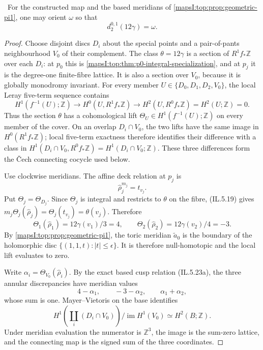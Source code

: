 \begin{lemma}
\label{mapsI:top:lem:first-transgression}
\ For the constructed map and the based meridians of
\cref{mapsI:top:prop:geometric-pi1}, one may orient \(\omega\) so that
\[
 d_2^{0,1}(12\gamma)=\omega.
\tag{IL.5.18}
\]
\end{lemma}

\begin{proof}
Choose disjoint discs \(D_i\) about the special points and a pair-of-pants
neighbourhood \(V_0\) of their complement.  The class
\(\theta=12\gamma\) is a section of \(R^1f_*\mathbb Z\) over each \(D_i\):
at \(p_0\) this is \cref{mapsI:top:thm:p0-integral-specialization}, and at \(p_j\)
it is the degree-one finite-fibre lattice.  It is also a section over
\(V_0\), because it is globally monodromy invariant.  For every member
\(U\in\{D_0,D_1,D_2,V_0\}\), the local Leray five-term sequence contains
\[
 H^1(f^{-1}(U);\mathbb Z)\longrightarrow
 H^0(U,R^1f_*\mathbb Z)\longrightarrow
 H^2(U,R^0f_*\mathbb Z)=H^2(U;\mathbb Z)=0.
\]
Thus the section \(\theta\) has a cohomological lift
\(\Theta_U\in H^1(f^{-1}(U);\mathbb Z)\) on every member of the cover.
On an overlap \(D_i\cap V_0\), the two lifts have the same image in
\(H^0(R^1f_*\mathbb Z)\); local five-term exactness therefore identifies
their difference with a class in
\(H^1(D_i\cap V_0,R^0f_*\mathbb Z)=H^1(D_i\cap V_0;\mathbb Z)\).
These three differences form the \v{C}ech connecting cocycle used below.

Use clockwise meridians.  The affine deck relation at \(p_j\) is
\[
 \widehat\rho_j^{m_j}=t_{v_j}.
\tag{IL.5.19}
\]
Put \(\Theta_j=\Theta_{D_j}\).  Since \(\Theta_j\) is integral and restricts
to \(\theta\) on the fibre, (IL.5.19) gives
\(m_j\Theta_j(\widehat\rho_j)=\Theta_j(t_{v_j})=\theta(v_j)\).  Therefore
\[
 \Theta_1(\widehat\rho_1)=12\gamma(v_1)/3=4,
 \qquad
 \Theta_2(\widehat\rho_2)=12\gamma(v_2)/4=-3.
\tag{IL.5.20}
\]
By \cref{mapsI:top:prop:geometric-pi1}, the toric meridian
\(\widetilde a_0\) is the
boundary of the holomorphic disc
\(\{(1,1,t):|t|\le\epsilon\}\).  It is therefore null-homotopic and the
local lift evaluates to zero.

Write \(\alpha_i=\Theta_{V_0}(\widehat\rho_i)\).  By the exact based cusp
relation (IL.5.23a), the three annular discrepancies have
meridian values
\[
 4-\alpha_1,\qquad -3-\alpha_2,\qquad \alpha_1+\alpha_2,
\tag{IL.5.21}
\]
whose sum is one.  Mayer--Vietoris on the base identifies
\[
H^1\!\left(\coprod_i(D_i\cap V_0)\right)/\operatorname{im}H^1(V_0)
\simeq H^2(B;\mathbb Z).
\]
Under meridian evaluation the numerator is \(\mathbb Z^3\), the image is
the sum-zero lattice, and the connecting map is the signed sum of the three
coordinates.


\end{proof}
